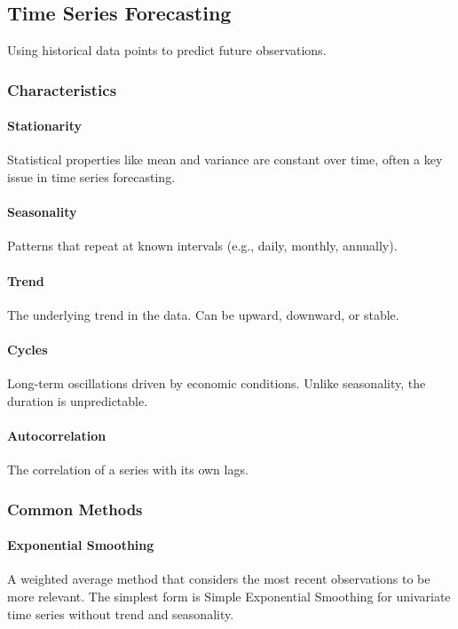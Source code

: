 \documentclass[english, threecolumn]{latex4ei/latex4ei_sheet}
\begin{document}
\begin{sectionbox}
\subsection{Time Series Forecasting}
Using historical data points to predict future observations.

\subsubsection{Characteristics}
\paragraph{Stationarity} Statistical properties like mean and variance are constant over time, often a key issue in time series forecasting.

\paragraph{Seasonality} Patterns that repeat at known intervals (e.g., daily, monthly, annually).

\paragraph{Trend} The underlying trend in the data. Can be upward, downward, or stable.

\paragraph{Cycles} Long-term oscillations driven by economic conditions. Unlike seasonality, the duration is unpredictable.

\paragraph{Autocorrelation} The correlation of a series with its own lags.

\subsubsection{Common Methods}
\paragraph{Exponential Smoothing}
A weighted average method that considers the most recent observations to be more relevant. The simplest form is Simple Exponential Smoothing for univariate time series without trend and seasonality.


\end{sectionbox}
\end{document}
